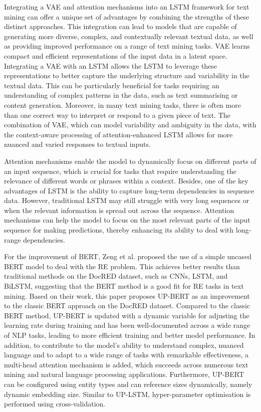 \documentclass[conference]{IEEEtran}
\begin{document}
Integrating a VAE and attention mechanisms into an LSTM framework for text mining can offer a unique set of advantages by combining the strengths of these distinct approaches. This integration can lead to models that are capable of generating more diverse, complex, and contextually relevant textual data, as well as providing improved performance on a range of text mining tasks. VAE learns compact and efficient representations of the input data in a latent space. Integrating a VAE with an LSTM allows the LSTM to leverage these representations to better capture the underlying structure and variability in the textual data. This can be particularly beneficial for tasks requiring an understanding of complex patterns in the data, such as text summarising or content generation. Moreover, in many text mining tasks, there is often more than one correct way to interpret or respond to a given piece of text. The combination of VAE, which can model variability and ambiguity in the data, with the context-aware processing of attention-enhanced LSTM allows for more nuanced and varied responses to textual inputs.

Attention mechanisms enable the model to dynamically focus on different parts of an input sequence, which is crucial for tasks that require understanding the relevance of different words or phrases within a context. Besides, one of the key advantages of LSTM is the ability to capture long-term dependencies in sequence data. However, traditional LSTM may still struggle with very long sequences or when the relevant information is spread out across the sequence. Attention mechanisms can help the model to focus on the most relevant parts of the input sequence for making predictions, thereby enhancing its ability to deal with long-range dependencies.

For the improvement of BERT, Zeng et al. proposed the use of a simple uncased BERT model to deal with the RE problem. This achieves better results than traditional methods on the DocRED dataset, such as CNNs, LSTM, and BiLSTM\cite{wang2019fine},  suggesting that the BERT method is a good fit for RE tasks in text mining. Based on their work, this paper proposes UP-BERT as an improvement to the classic BERT approach on the DocRED dataset. Compared to the classic BERT method, UP-BERT is updated with a dynamic variable for adjusting the learning rate during training and has been well-documented across a wide range of NLP tasks, leading to more efficient training and better model performance. In addition, to contribute to the model's ability to understand complex, nuanced language and to adapt to a wide range of tasks with remarkable effectiveness, a multi-head attention mechanism is added, which succeeds across numerous text mining and natural language processing applications. Furthermore, UP-BERT can be configured using entity types and can reference sizes dynamically, namely dynamic embedding size. Similar to UP-LSTM, hyper-parameter optimisation is performed using cross-validation.
\end{document}

